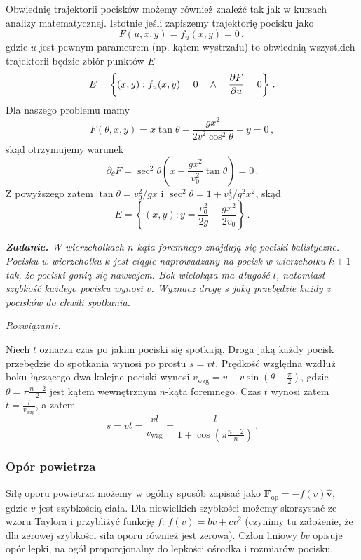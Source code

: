 \documentclass[../main.tex]{subfiles}
\begin{document}
Obwiednię trajektorii pocisków możemy również znaleźć tak jak w kursach analizy matematycznej. Istotnie jeśli zapiszemy trajektorię pocisku jako
\begin{equation*}
    F(u,x,y)=f_u(x,y)=0\,,
\end{equation*}
gdzie \(u\) jest pewnym parametrem (np. kątem wystrzału) to obwiednią wszystkich trajektorii będzie zbiór punktów \(E\)
\begin{equation*}
    E=\left\{(x,y):f_u(x,y)=0\quad\land\quad \pdv{F}{u}=0\right\}\,.
\end{equation*}
Dla naszego problemu mamy
\begin{equation*}
    F(\theta,x,y)=x\tan\theta-\frac{gx^2}{2v_0^2\cos^2\theta}-y=0\,,
\end{equation*}
skąd otrzymujemy warunek
\begin{equation*}
    \partial_\theta F=\sec^2\theta\left(x-\frac{gx^2}{v_0^2}\tan\theta\right)=0\,.
\end{equation*}
Z powyższego zatem \(\tan\theta=v_0^2/gx\) i \(\sec^2\theta=1+v_0^4/g^2x^2\), skąd
\begin{equation*}
    E=\left\{(x,y): y=\frac{v_0^2}{2g}-\frac{gx^2}{2v_0}\right\}\,.
\end{equation*}
\medskip

{\textbf{\textit{Zadanie.}}}
\textit{W wierzchołkach \(n\)-kąta foremnego znajdują się pociski balistyczne. Pocisku w wierzchołku \(k\) jest ciągle naprowadzany na pocisk w wierzchołku \(k+1\) tak, że pociski gonią się nawzajem. Bok wielokąta ma długość \(l\), natomiast szybkość każdego pocisku wynosi \(v\). Wyznacz drogę \(s\) jaką przebędzie każdy z pocisków do chwili spotkania.}
\medskip

\textit{Rozwiązanie.
\medskip}

Niech \(t\) oznacza czas po jakim pociski się spotkają. Droga jaką każdy pocisk przebędzie do spotkania wynosi po prostu \(s=vt\). Prędkość względna wzdłuż boku łączącego dwa kolejne pociski wynosi \(v_\text{wzg}=v-v\sin\left(\theta-\frac{\pi}{2}\right)\), gdzie \(\theta=\pi\frac{n-2}{2}\) jest kątem wewnętrznym \(n\)-kąta foremnego. Czas \(t\) wynosi zatem \(t=\frac{l}{v_\text{wzg}}\), a zatem
\begin{equation*}
    s=vt=\frac{vl}{v_\text{wzg}}=\frac{l}{1+\cos\left(\pi\frac{n-2}{n}\right)}\,.
\end{equation*}
\subsubsection{Opór powietrza}
Siłę oporu powietrza możemy w ogólny sposób zapisać jako \(\mathbf{F}_\text{op}=-f(v)\mathbf{\hat v}\), gdzie \(v\) jest szybkością ciała. Dla niewielkich szybkości możemy skorzystać ze wzoru Taylora i przybliżyć funkcję \(f\): \(f(v)=bv+cv^2\) (czynimy tu założenie, że dla zerowej szybkości siła oporu również jest zerowa). Człon liniowy \(bv\) opisuje opór lepki, na ogół proporcjonalny do lepkości ośrodka i rozmiarów pocisku.
\end{document}
